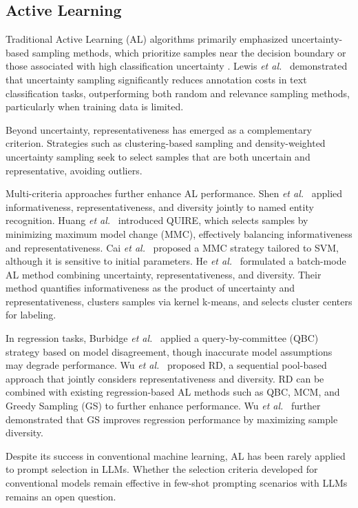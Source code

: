 \documentclass[journal,twocolumn]{IEEEtran}
\begin{document}
\subsection{Active Learning}

Traditional Active Learning (AL) algorithms primarily emphasized uncertainty-based sampling methods, which prioritize samples near the decision boundary or those associated with high classification uncertainty \cite{Settles2009}. Lewis \textit{et al.}~\cite{lewis1995sequential} demonstrated that uncertainty sampling significantly reduces annotation costs in text classification tasks, outperforming both random and relevance sampling methods, particularly when training data is limited.

Beyond uncertainty, representativeness has emerged as a complementary criterion. Strategies such as clustering-based sampling \cite{nguyen2004active} and density-weighted uncertainty sampling \cite{settles2008analysis} seek to select samples that are both uncertain and representative, avoiding outliers.

Multi-criteria approaches further enhance AL performance. Shen \textit{et al.}~\cite{Shen2004a} applied informativeness, representativeness, and diversity jointly to named entity recognition. Huang \textit{et al.}~\cite{huang2010active} introduced QUIRE, which selects samples by minimizing maximum model change (MMC), effectively balancing informativeness and representativeness. Cai \textit{et al.}~\cite{Cai2014} proposed a MMC strategy tailored to SVM, although it is sensitive to initial parameters. He \textit{et al.}~\cite{He2014} formulated a batch-mode AL method combining uncertainty, representativeness, and diversity. Their method quantifies informativeness as the product of uncertainty and representativeness, clusters samples via kernel k-means, and selects cluster centers for labeling.

In regression tasks, Burbidge \textit{et al.}~\cite{Burbidge2017} applied a query-by-committee (QBC) strategy based on model disagreement, though inaccurate model assumptions may degrade performance. Wu \textit{et al.}~\cite{wu2018pool}  proposed RD, a sequential pool-based approach that jointly considers representativeness and diversity. RD can be combined with existing regression-based AL methods such as QBC, MCM, and Greedy Sampling (GS) to further enhance performance. Wu \textit{et al.}~\cite{drwuiGS2019} further demonstrated that GS improves regression performance by maximizing sample diversity.

Despite its success in conventional machine learning, AL has been rarely applied to prompt selection in LLMs. Whether the selection criteria developed for conventional models remain effective in few-shot prompting scenarios with LLMs remains an open question.
\end{document}
